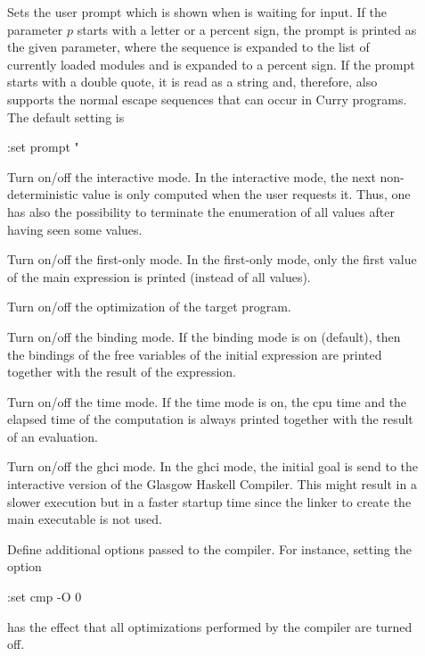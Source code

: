 \begin{description}
\item[]
Sets the user prompt which is shown when \CYS is waiting for input.
If the parameter $p$ starts with a letter or a percent sign,
the prompt is printed as the given parameter,
where the sequence  is expanded to the list of
currently loaded modules
and \ccode{\%\%} is expanded to a percent sign.
If the prompt starts with a double quote, it is read as a string and,
therefore, also supports the normal escape sequences that can occur
in Curry programs. The default setting is
\begin{curry}
:set prompt "%
\end{curry}

\item[]
Turn on/off the interactive mode.
In the interactive mode, the next non-deterministic value
is only computed when the user requests it.
Thus, one has also the possibility to terminate the
enumeration of all values after having seen some values.

\item[]
Turn on/off the first-only mode.
In the first-only mode, only the first value
of the main expression is printed (instead of all values).

\item[]
Turn on/off the optimization of the target program.

\item[]
Turn on/off the binding mode.
If the binding mode is on (default),
then the bindings of the free variables of the initial expression
are printed together with the result of the expression.

\item[]
Turn on/off the time mode. If the time mode is on,
the cpu time and the elapsed time
of the computation is always printed together with the result
of an evaluation.

\item[]
Turn on/off the ghci mode.
In the ghci mode, the initial goal is send to the interactive version
of the Glasgow Haskell Compiler. This might result in a slower
execution but in a faster startup time since the linker
to create the main executable is not used.

\item[]
Define additional options passed to the \CYS compiler.
For instance, setting the option
\begin{curry}
:set cmp -O 0
\end{curry}
has the effect that all optimizations performed by the \CYS compiler
are turned off.


\end{description}
